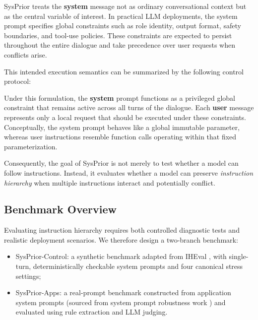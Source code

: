 \documentclass{article}
\newcommand{\ihbench}{SysPrior}
\newcommand{\ihbenchs}{SysPrior-Control}
\newcommand{\ihbenchr}{SysPrior-Apps}
\newcommand{\sysmsg}{\textbf{system}}
\newcommand{\usermsg}{\textbf{user}}
\begin{document}
\ihbench{} treats the \sysmsg{} message not as ordinary conversational context but as the central variable of interest. In practical LLM deployments, the system prompt specifies global constraints such as role identity, output format, safety boundaries, and tool-use policies. These constraints are expected to persist throughout the entire dialogue and take precedence over user requests when conflicts arise.

This intended execution semantics can be summarized by the following control protocol:

\begin{center}
\end{center}

Under this formulation, the \sysmsg{} prompt functions as a privileged global constraint that remains active across all turns of the dialogue. Each \usermsg{} message represents only a local request that should be executed under these constraints. Conceptually, the system prompt behaves like a global immutable parameter, whereas user instructions resemble function calls operating within that fixed parameterization.

Consequently, the goal of \ihbench{} is not merely to test whether a model can follow instructions. Instead, it evaluates whether a model can preserve \emph{instruction hierarchy} when multiple instructions interact and potentially conflict.

\subsection{Benchmark Overview}

Evaluating instruction hierarchy requires both controlled diagnostic tests and realistic deployment scenarios. We therefore design a two-branch benchmark:

\begin{itemize}[leftmargin=1.5em]
\item \ihbenchs: a synthetic benchmark adapted from IHEval \cite{zhang2025iheval}, with single-turn, deterministically checkable system prompts and four canonical stress settings;
\item \ihbenchr: a real-prompt benchmark constructed from application system prompts (sourced from system prompt robustness work \cite{mu2025systempromptrobustness}) and evaluated using rule extraction and LLM judging.
\end{itemize}
\end{document}
